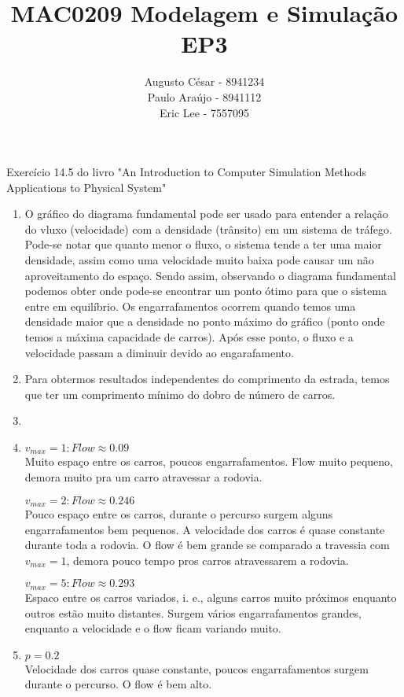 \documentclass[11pt]{extarticle}
\author{Augusto César - 8941234 \\Paulo Araújo - 8941112\\Eric Lee - 7557095}
\title{MAC0209 Modelagem e Simulação \\ EP3}
\begin{document}
\maketitle{}
\paragraph{}
Exercício 14.5 do livro "An Introduction to Computer Simulation Methods Applications to Physical System"
\begin{enumerate}
  \renewcommand{\theenumi}{\alph{enumi}}
\item                           %
  O gráfico do diagrama fundamental pode ser usado para entender a relação do vluxo (velocidade) com a densidade (trânsito) em um sistema de tráfego.
  Pode-se notar que quanto menor o fluxo, o sistema tende a ter uma maior densidade, assim como uma velocidade muito baixa pode causar um não aproveitamento do espaço. Sendo assim, observando o diagrama fundamental podemos obter onde pode-se encontrar um ponto ótimo para que o sistema entre em equilíbrio.
  Os engarrafamentos ocorrem quando temos uma densidade maior que a densidade no ponto máximo do gráfico (ponto onde temos a máxima capacidade de carros). Após esse ponto, o fluxo e a velocidade passam a diminuir devido ao engarafamento.
\item                           %
  Para obtermos resultados independentes do comprimento da estrada, temos que ter um comprimento mínimo do dobro de número de carros.
\item                           %
  
\item                           %
  $v_{max} = 1 : Flow \approx 0.09$ \\
  Muito espaço entre os carros, poucos engarrafamentos. Flow muito pequeno, demora muito pra um carro
  atravessar a rodovia.
  
  $v_{max} = 2 : Flow \approx 0.246$\\
  Pouco espaço entre os carros, durante o percurso surgem alguns engarrafamentos bem pequenos. A velocidade dos carros é quase constante durante toda a rodovia. O flow é bem grande se comparado a travessia com $v_{max} = 1$, demora pouco tempo pros carros atravessarem a rodovia.

  $v_{max} = 5 : Flow \approx 0.293$\\
  Espaco entre os carros variados, i. e., alguns carros muito próximos enquanto outros estão muito distantes. Surgem vários engarrafamentos grandes, enquanto a velocidade e o flow ficam variando muito.
\item                           %
  $p = 0.2$ \\
  Velocidade dos carros quase constante, poucos engarrafamentos surgem durante o percurso. O flow é bem alto.


\end{enumerate}
\end{document}
